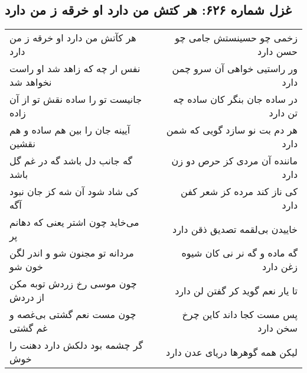 \begin{center}
\section*{غزل شماره ۶۲۶: هر کتش من دارد او خرقه ز من دارد}
\label{sec:0626}
\begin{longtable}{l p{0.5cm} r}
هر کآتش من دارد او خرقه ز من دارد
&&
زخمی چو حسینستش جامی چو حسن دارد
\\
نفس ار چه که زاهد شد او راست نخواهد شد
&&
ور راستیی خواهی آن سرو چمن دارد
\\
جانیست تو را ساده نقش تو از آن زاده
&&
در ساده جان بنگر کان ساده چه تن دارد
\\
آیینه جان را بین هم ساده و هم نقشین
&&
هر دم بت نو سازد گویی که شمن دارد
\\
گه جانب دل باشد گه در غم گل باشد
&&
ماننده آن مردی کز حرص دو زن دارد
\\
کی شاد شود آن شه کز جان نبود آگه
&&
کی ناز کند مرده کز شعر کفن دارد
\\
می‌خاید چون اشتر یعنی که دهانم پر
&&
خاییدن بی‌لقمه تصدیق ذقن دارد
\\
مردانه تو مجنون شو و اندر لگن خون شو
&&
گه ماده و گه نر نی کان شیوه زغن دارد
\\
چون موسی رخ زردش توبه مکن از دردش
&&
تا یار نعم گوید کر گفتن لن دارد
\\
چون مست نعم گشتی بی‌غصه و غم گشتی
&&
پس مست کجا داند کاین چرخ سخن دارد
\\
گر چشمه بود دلکش دارد دهنت را خوش
&&
لیکن همه گوهرها دریای عدن دارد
\\
\end{longtable}
\end{center}
